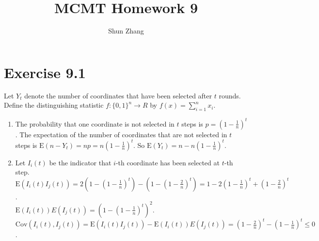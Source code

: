 \documentclass[10pt]{article}
\title{MCMT Homework 9}
\author{Shun Zhang}
\date{}
\newcommand{\Cov}{\mathrm{Cov}}
\newcommand{\E}{\mathrm{E}}
\begin{document}
\maketitle

\section*{Exercise 9.1}

Let $Y_t$ denote the number of coordinates that have been selected after $t$ rounds.
Define the distinguishing statistic $f:\{0,1\}^n \rightarrow R$ by
$f(x)=\sum_{i=1}^n x_i$.

\begin{enumerate}

\item The probability that one coordinate is not selected in $t$ steps is $p = (1 -
\frac{1}{n})^t$. The expectation of the number of coordinates that are not
selected in $t$ steps is $\E(n - Y_t) = np = n(1 - \frac{1}{n})^t$. So $\E(Y_t) =
n - n(1 - \frac{1}{n})^t$.

\item Let $I_i(t)$ be the indicator that $i$-th coordinate has been selected at
$t$-th step.\\
$\E(I_i(t) I_j(t)) = 2(1 - (1 - \frac{1}{n})^t) - (1 - (1 - \frac{2}{n})^t) = 1
- 2(1 - \frac{1}{n})^t + (1 - \frac{2}{n})^t$.\\
$\E(I_i(t))E(I_j(t)) = (1 - (1 - \frac{1}{n})^t)^2$.\\
$\Cov(I_i(t), I_j(t)) = \E(I_i(t) I_j(t)) - \E(I_i(t))E(I_j(t)) = (1 -
\frac{2}{n})^t - (1 - \frac{1}{n})^t \leq 0$.

\end{enumerate}
\end{document}

